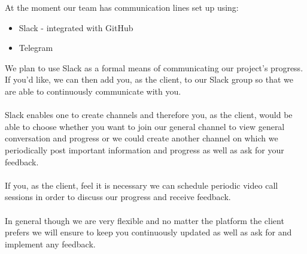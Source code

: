 At the moment our team has communication lines set up using:
		\begin{itemize}
			\item Slack - integrated with GitHub
			\item Telegram
		\end{itemize}
		We plan to use Slack as a formal means of communicating our project's progress. If you'd like, we can then add you, as the client, to our Slack group so that we are able to continuously communicate with you.\\\\
		Slack enables one to create channels and therefore you, as the client, would be able to choose whether you want to join our general channel to view general conversation and progress or we could create another channel on which we periodically post important information and progress as well as ask for your feedback.\\\\
		If you, as the client, feel it is necessary we can schedule periodic video call sessions in order to discuss our progress and receive feedback.\\\\
		In general though we are very flexible and no matter the platform the client prefers we will ensure to keep you continuously updated as well as ask for and implement any feedback.